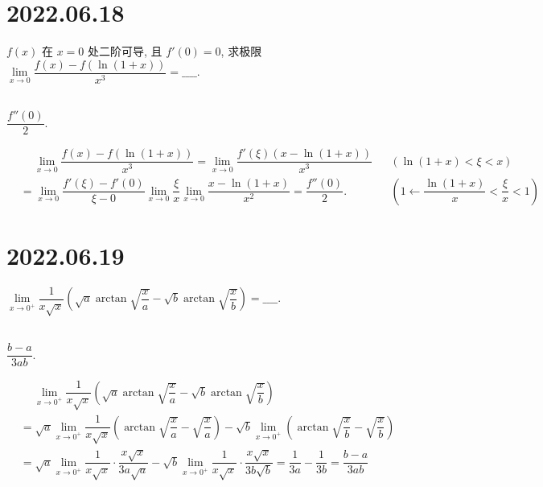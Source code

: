 \documentclass[lang=cn,12pt]{elegantbook}
\begin{document}
\section*{2022.06.18}

$f(x)$ 在 $x = 0$ 处二阶可导, 且 $f'(0)= 0$, 求极限 $
\lim\limits_{x \to 0} \dfrac{
  f(x) - f(\ln (1+x))}{x^3} = \_\_\_\_.$
\\ \\

\begin{solution}
  $\dfrac{f''(0)}{2}.$

  $\begin{aligned}
  &\quad\  \lim\limits_{x \to 0} \dfrac{
    f(x) - f(\ln (1+x))}{x^3}
  = \lim\limits_{x \to 0} \dfrac{
    f'(\xi)(x-\ln(1+x))}{x^3} && (\ln(1+x) < \xi < x)\\
  &= \lim\limits_{x \to 0} \dfrac{
    f'(\xi)-f'(0)}{\xi-0} \lim\limits_{x \to 0} \dfrac{
      \xi}{x}  \lim\limits_{x \to 0} \dfrac{
        x-\ln(1+x)}{x^2} 
  = \dfrac{f''(0)}{2}. && \left(1\gets \dfrac{\ln(1+x)}{x} <
    \dfrac{\xi}{x} < 1\right)
  \end{aligned}
  $
\end{solution}

\section*{2022.06.19}

$\lim\limits_{x \to 0^{+}} \dfrac{
  1}{x\sqrt{x}}\left(\sqrt{a}\arctan \sqrt{\dfrac{x}{a}} - 
    \sqrt{b}\arctan \sqrt{\dfrac{x}{b}}\right) = \_\_\_\_.$
\\ \\

\begin{solution}
  $\dfrac{b-a}{3ab}.$

  $\begin{aligned}
  &\quad \ \lim\limits_{x \to 0^{+}} \dfrac{
    1}{x\sqrt{x}}\left(\sqrt{a}\arctan \sqrt{\dfrac{x}{a}} - 
      \sqrt{b}\arctan \sqrt{\dfrac{x}{b}}\right)\\
  &= \sqrt{a} \lim\limits_{x \to 0^{+}}\dfrac{1}{x\sqrt{x}} 
    \left(\arctan \sqrt{\dfrac{x}{a}} - \sqrt{\dfrac{x}{a}} \right) 
    - \sqrt{b} \lim\limits_{x \to 0^{+}} \left(\arctan \sqrt{\dfrac{x}{b}} - 
    \sqrt{\dfrac{x}{b}} \right)
    \\
  &= \sqrt{a} \lim\limits_{x \to 0^{+}}\dfrac{1}{x\sqrt{x}}\cdot \dfrac{x\sqrt{x}}{3a\sqrt{a}} -
    \sqrt{b} \lim\limits_{x \to 0^{+}}\dfrac{1}{x\sqrt{x}}\cdot \dfrac{x\sqrt{x}}{3b\sqrt{b}}
  = \dfrac{1}{3a} - \dfrac{1}{3b} = \dfrac{b-a}{3ab}
  \end{aligned}
  $
\end{solution}
\end{document}
